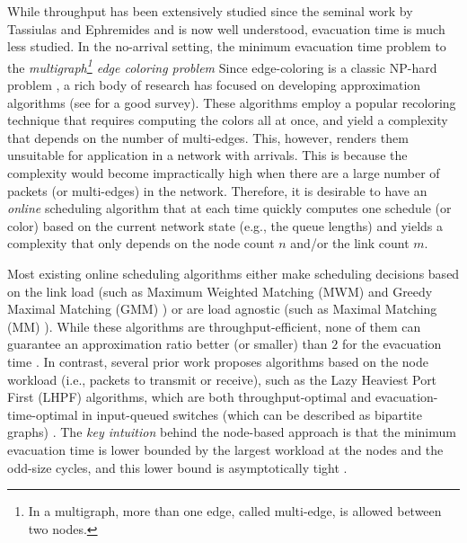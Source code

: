 \documentclass[10pt,journal,compsoc]{IEEEtran}
\newcommand{\HIGH}[1]{{\color{black}{#1}}}
\newcommand{\high}[1]{{\color{black}{#1}}}
\begin{document}
While throughput has been extensively studied since the seminal work by Tassiulas and Ephremides 
\cite{tassiulas92} and is now well understood, evacuation time is much less studied. In the no-arrival 
setting, the minimum evacuation time problem \high{is equivalent} to the \emph{multigraph\footnote{In 
a multigraph, more than one edge, called multi-edge, is allowed between two nodes.} edge coloring problem}
\HIGH{due to the following: each multi-edge corresponds to a packet waiting to be transmitted over the link 
between the nodes of the multi-edge; each color corresponds to a feasible schedule (or a matching); finding 
the chromatic index (i.e., the minimum number of colors such that, each multi-edge is assigned a color and 
two multi-edges sharing a common node cannot have the same color) is equivalent to minimizing the time 
for evacuating all the packets by finding a matching at a time.}
Since edge-coloring is a classic NP-hard problem \cite{holyer81}, a rich body of research has focused on 
developing approximation algorithms (see \cite{stiebitz12} for a good survey). 
These algorithms employ a popular recoloring technique that requires computing the colors all at once, 
and yield a complexity that depends on the number of multi-edges. This, however, renders them 
unsuitable for application in a network with arrivals. This is because the complexity would become 
impractically high when there are a large number of packets (or multi-edges) in the network.
Therefore, it is desirable to have an \emph{online} scheduling algorithm that at each time quickly 
computes one schedule (or color) based on the current network state (e.g., the queue lengths) and 
yields a complexity that only depends on the node count $n$ and/or the link count $m$.

Most existing online scheduling algorithms either make scheduling decisions based on the link load (such as 
Maximum Weighted Matching (MWM) \cite{tassiulas92} and Greedy Maximal Matching (GMM) \cite{lin06,joo09}) 
or are load agnostic (such as Maximal Matching (MM) \cite{lin06,wu07}). While these algorithms are throughput-efficient, 
none of them can guarantee an approximation ratio better (or smaller) than $2$ for the evacuation time \cite{guptathesis}. 
In contrast, several prior work \cite{mekkittikul98,tabatabaee09,guptathesis,ji15ciss} proposes algorithms based 
on the node workload (i.e., packets to transmit or receive), such as the Lazy Heaviest Port First (LHPF) 
algorithms, which are both throughput-optimal and evacuation-time-optimal in input-queued switches (which 
can be described as bipartite graphs) \cite{guptathesis}. The \emph{key intuition} behind the node-based 
approach is that the minimum evacuation time is lower bounded by the largest workload at the nodes and 
the odd-size cycles, and this lower bound is asymptotically tight \cite{kahn96}.
\high{Hence, giving a higher priority to scheduling nodes with heavy workload leads to better evacuation time performance,
while the link-based approach that fails to respect this crucial fact results in unsatisfactory evacuation time performance.}
\end{document}
